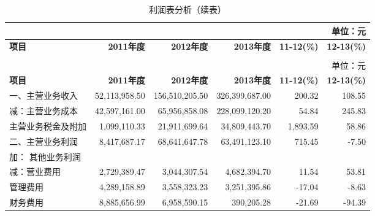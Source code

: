 \begin{longtable}{>{\scriptsize}l>{\scriptsize}r>{\scriptsize}r>{\scriptsize}r>{\scriptsize}r>{\scriptsize}r}
\caption[利润表分析]{利润表分析}\\  %
&&&&& {\scriptsize 单位：元}\\
\hline\hline
\rowcolor{mycyan}	\hspace{3em} \bfseries 项目 	& \bfseries 2011年度\hspace{1em} & \bfseries 2012年度\hspace{1em} 	& \bfseries 2013年度\hspace{1em} &  \bfseries  11-12(\%)     & \hspace{1em} \bfseries  12-13(\%)  \\ \endfirsthead          %
\caption[]{利润表分析（续表）} \\ 
&&&&& {\scriptsize 单位：元}\\                        %
\hline\hline
\rowcolor{mycyan}	\hspace{3em} \bfseries 项目 	& \bfseries 2011年度\hspace{1em} & \bfseries 2012年度\hspace{1em} 	& \bfseries 2013年度\hspace{1em} &  \bfseries  11-12(\%)     & \hspace{1em} \bfseries  12-13(\%) \\  \endhead                %
\hline
\endfoot
\hline   %
一、主营业务收入	& 52,113,958.50	&	156,510,205.50	&	326,399,687.00		&	200.32		&		108.55 \\ 
  \quad     减：主营业务成本		& 42,597,161.00		& 65,956,858.08		& 228,099,120.20		& 	54.84		& 		245.83 \\ 
     \qquad\quad             主营业务税金及附加	& 	1,099,110.33	& 	21,911,699.64	& 	34,809,443.70	& 		1,893.59		& 		58.86 \\ 
二、主营业务利润	& 	8,417,687.17	& 	68,641,647.78	& 	63,491,123.10		& 	715.45		& 		-7.50 \\ 
        \quad    加： 其他业务利润			& 		& 	& 	& 	&  \\ 
       \quad     减：营业费用	& 	2,729,389.47	& 	3,044,307.54	& 	4,682,394.70	& 		11.54		& 		53.81 \\ 
           \qquad\quad            管理费用	& 	4,289,158.89	& 	3,558,323.23	& 	3,251,395.86		& 	-17.04		& 		-8.63 \\ 
              \qquad\quad         财务费用	& 	8,885,656.99	& 	6,958,590.15	& 	390,205.28		& 	-21.69		& 		-94.39 \\ 

\end{longtable}
